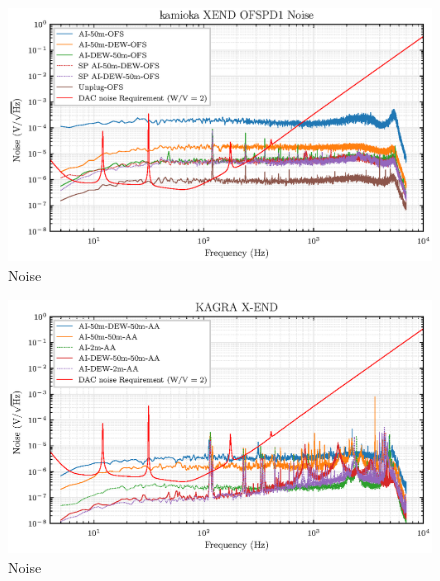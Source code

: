 \begin{figure}[bt]
\centering
\includegraphics[width=1\textwidth]{figure/noise/DEWnoiseKamiokaSP}
\caption{Noise}\label{fig:noiseKSP}

\end{figure}
\begin{figure}[bt]
\centering
\includegraphics[width=1\textwidth]{figure/noise/DEWnoiseKamioka}
\caption{Noise}\label{fig:noiseK}
\end{figure}